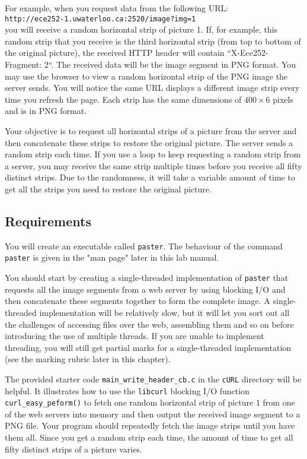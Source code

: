 For example, when you request data from the following URL: \\
\verb+http://ece252-1.uwaterloo.ca:2520/image?img=1+  \\
you will receive a random horizontal strip of picture 1. If, for example, this random strip that you receive is the third horizontal strip (from top to bottom of the original picture), the received HTTP header will contain ``X-Ece252-Fragment: 2``. The received data will be the image segment in PNG format.
You may use the browser to view a random horizontal strip of the PNG image the server sends. You will notice the same URL displays a different image strip every time you refresh the page. Each strip has the same dimensions of $400 \times 6$ pixels and is in PNG format. 

Your objective is to request all horizontal strips of a picture from the server and then concatenate these strips to restore the original picture. The server sends a random strip each time. If you use a loop to keep requesting a random strip from a server, you may receive the same strip multiple times before you receive all fifty distinct strips. Due to the randomness, it will take a variable amount of time to get all the strips you need to restore the original picture.

\subsection{Requirements}

You will create an executable called \verb+paster+. The behaviour of the command \verb+paster+ is given in the "man page" later in this lab manual.

You should start by creating a single-threaded implementation of \verb+paster+ that requests all the image segments from a web server by using blocking I/O and then concatenate these segments together to form the complete image.
A single-threaded implementation will be relatively slow, but it will let you sort out all the challenges of accessing files over the web, assembling them and so on before introducing the use of multiple threads.
If you are unable to implement threading, you will still get partial marks for a single-threaded implementation (see the marking rubric later in this chapter).

The provided starter code \verb+main_write_header_cb.c+ in the \verb+cURL+ directory will be helpful. It illustrates how to use the \verb+libcurl+ blocking I/O function \verb+curl_easy_peform()+ to fetch one random horizontal strip of picture $1$ from one of the web servers into memory and then output the received image segment to a PNG file. Your program should repeatedly fetch the image strips until you have them all. Since you get a random strip each time, the amount of time to get all fifty distinct strips of a picture varies.

